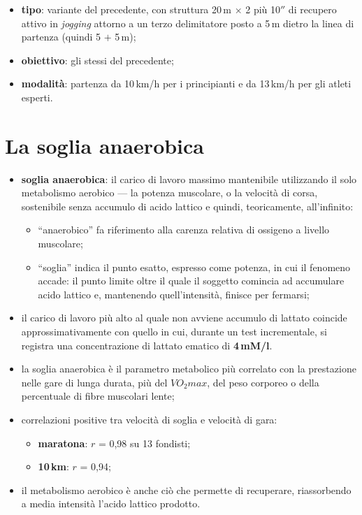 \begin{itemize}
  \item \textbf{tipo}: variante del precedente, con struttura 20\,m $\times$ 2 più 10$''$ di
    recupero attivo in \textit{jogging} attorno a un terzo delimitatore posto a 5\,m dietro la linea
    di partenza (quindi 5 $+$ 5\,m);
  \item \textbf{obiettivo}: gli stessi del precedente;
  \item \textbf{modalità}: partenza da 10\,km/h per i principianti e da 13\,km/h per gli atleti
    esperti.
\end{itemize}

\section{La soglia anaerobica}

\begin{itemize}
  \item \textbf{soglia anaerobica}: il carico di lavoro massimo mantenibile utilizzando il solo
    metabolismo aerobico --- la potenza muscolare, o la velocità di corsa, sostenibile senza
    accumulo di acido lattico e quindi, teoricamente, all'infinito:
    \begin{itemize}
      \item ``anaerobico'' fa riferimento alla carenza relativa di ossigeno a livello muscolare;
      \item ``soglia'' indica il punto esatto, espresso come potenza, in cui il fenomeno accade: il
        punto limite oltre il quale il soggetto comincia ad accumulare acido lattico e, mantenendo
        quell'intensità, finisce per fermarsi;
    \end{itemize}
  \item il carico di lavoro più alto al quale non avviene accumulo di lattato coincide
    approssimativamente con quello in cui, durante un test incrementale, si registra una
    concentrazione di lattato ematico di \textbf{4\,mM/l}.
\end{itemize}

\begin{itemize}
  \item la soglia anaerobica è il parametro metabolico più correlato con la prestazione nelle gare
    di lunga durata, più del $VO_2max$, del peso corporeo o della percentuale di fibre muscolari
    lente;
  \item correlazioni positive tra velocità di soglia e velocità di gara:
    \begin{itemize}
      \item \textbf{maratona}: $r$ = 0,98 su 13 fondisti;
      \item \textbf{10\,km}: $r$ = 0,94;
    \end{itemize}
  \item il metabolismo aerobico è anche ciò che permette di recuperare, riassorbendo a media
    intensità l'acido lattico prodotto.
\end{itemize}

